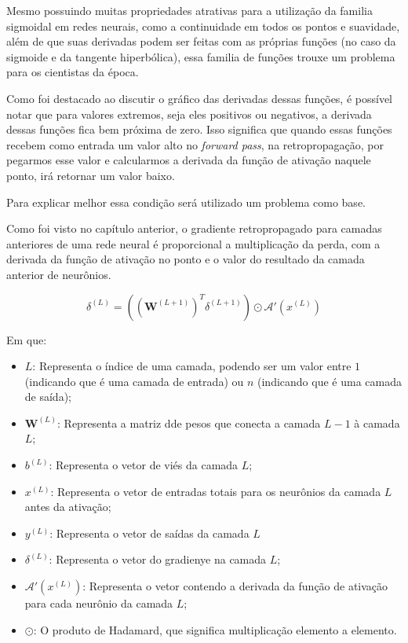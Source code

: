 Mesmo possuindo muitas propriedades atrativas para a utilização da familia sigmoidal em redes neurais, como a continuidade em todos os pontos e suavidade, além de que suas derivadas podem ser feitas com as próprias funções (no caso da sigmoide e da tangente hiperbólica), essa familia de funções trouxe um problema para os cientistas da época.

Como foi destacado ao discutir o gráfico das derivadas dessas funções, é possível notar que para valores extremos, seja eles positivos ou negativos, a derivada dessas funções fica bem próxima de zero. Isso significa que quando essas funções recebem como entrada um valor alto no \textit{forward pass}, na retropropagação, por pegarmos esse valor e calcularmos a derivada da função de ativação naquele ponto, irá retornar um valor baixo.

Para explicar melhor essa condição será utilizado um problema como base.

Como foi visto no capítulo anterior, o gradiente retropropagado para camadas anteriores de uma rede neural é proporcional a multiplicação da perda, com a derivada da função de ativação no ponto e o valor do resultado da camada anterior de neurônios. 

\[
    \delta^{(L)} = \left( \left( \textbf{W}^{(L+1)} \right)^T \delta^{(L+1)} \right)  \odot \mathcal{A}'(x^{(L)})
\]

Em que: 

\begin{itemize}
    \item $L$: Representa o índice de uma camada, podendo ser um valor entre $1$ (indicando que é uma camada de entrada) ou $n$ (indicando que é uma camada de saída);
    \item $\textbf{W}^{(L)}$: Representa a matriz dde pesos que conecta a camada $L - 1$ à camada $L$;
    \item $b^{(L)}$: Representa o vetor de viés da camada $L$;
    \item $x^{(L)}$: Representa o vetor de entradas totais para os neurônios da camada $L$ antes da ativação;
    \item $y^{(L)}$: Representa o vetor de saídas da camada $L$
    \item $\delta^{(L)}$: Representa o vetor do gradienye na camada $L$;
    \item $\mathcal{A}'(x^{(L)})$: Representa o vetor contendo a derivada da função de ativação para cada neurônio da camada $L$;
    \item $\odot$: O produto de Hadamard, que significa multiplicação elemento a elemento.
\end{itemize}

